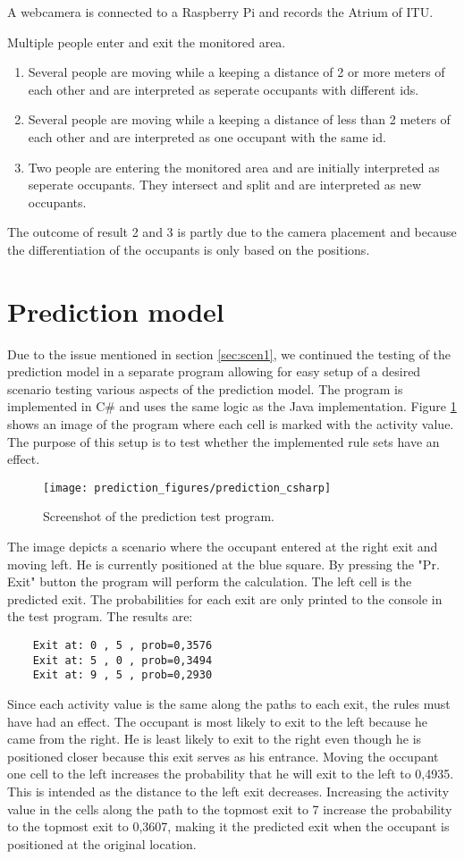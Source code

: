 A webcamera is connected to a Raspberry Pi and records the Atrium of ITU.

Multiple people enter and exit the monitored area.

\begin{enumerate}
\item Several people are moving while a keeping a distance of 2 or more meters of each other and are interpreted as seperate occupants with different ids.
\item Several people are moving while a keeping a distance of less than 2 meters of each other and are interpreted as one occupant with the same id.
\item Two people are entering the monitored area and are initially interpreted as seperate occupants. They intersect and split and are interpreted as new occupants.
\end{enumerate}

The outcome of result 2 and 3 is partly due to the camera placement and because the differentiation of the occupants is only based on the positions. 

\section{Prediction model}
\label{eval_prediction}
Due to the issue mentioned in section \ref{sec:scen1}, we continued the testing of the prediction model in a separate program allowing for easy setup of a desired scenario testing various aspects of the prediction model. The program is implemented in C\# and uses the same logic as the Java implementation. Figure \ref{fig:pred_c} shows an image of the program where each cell is marked with the activity value. The purpose of this setup is to test whether the implemented rule sets have an effect.
\begin{figure}[htb]
	\centering
	\texttt{[image: prediction\_figures/prediction\_csharp]}
	\caption{Screenshot of the prediction test program.}
	\label{fig:pred_c}
\end{figure}
The image depicts a scenario where the occupant entered at the right exit and moving left. He is currently positioned at the blue square. By pressing the "Pr. Exit" button the program will perform the calculation. The left cell is the predicted exit. The probabilities for each exit are only printed to the console in the test program. The results are:
\begin{verbatim}
    Exit at: 0 , 5 , prob=0,3576
    Exit at: 5 , 0 , prob=0,3494
    Exit at: 9 , 5 , prob=0,2930
\end{verbatim}
Since each activity value is the same along the paths to each exit, the rules must have had an effect. The occupant is most likely to exit to the left because he came from the right. He is least likely to exit to the right even though he is positioned closer because this exit serves as his entrance. Moving the occupant one cell to the left increases the probability that he will exit to the left to 0,4935. This is intended as the distance to the left exit decreases. Increasing the activity value in the cells along the path to the topmost exit to 7 increase the probability to the topmost exit to 0,3607, making it the predicted exit when the occupant is positioned at the original location. 
